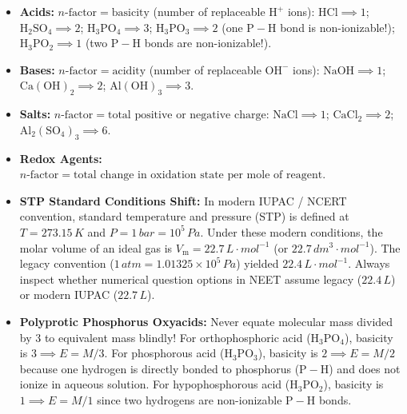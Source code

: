 \documentclass[10pt,a4paper]{article}
\begin{document}
\begin{ncertbox}
\begin{itemize}
  \item \textbf{Acids:} $n\text{-factor} = \text{basicity}$ (number of replaceable $\mathrm{H}^+$ ions): $\mathrm{HCl} \implies 1$; $\mathrm{H_2SO_4} \implies 2$; $\mathrm{H_3PO_4} \implies 3$; $\mathrm{H_3PO_3} \implies 2$ (one $\mathrm{P-H}$ bond is non-ionizable!); $\mathrm{H_3PO_2} \implies 1$ (two $\mathrm{P-H}$ bonds are non-ionizable!).
  \item \textbf{Bases:} $n\text{-factor} = \text{acidity}$ (number of replaceable $\mathrm{OH}^-$ ions): $\mathrm{NaOH} \implies 1$; $\mathrm{Ca(OH)_2} \implies 2$; $\mathrm{Al(OH)_3} \implies 3$.
  \item \textbf{Salts:} $n\text{-factor} = \text{total positive or negative charge}$: $\mathrm{NaCl} \implies 1$; $\mathrm{CaCl_2} \implies 2$; $\mathrm{Al_2(SO_4)_3} \implies 6$.
  \item \textbf{Redox Agents:} $n\text{-factor} = \text{total change in oxidation state per mole of reagent}$.
\end{itemize}
\end{ncertbox}

\begin{trapbox}
\begin{itemize}
  \item \textbf{STP Standard Conditions Shift:} In modern IUPAC / NCERT convention, standard temperature and pressure (STP) is defined at $T = 273.15\,\si{K}$ and $P = 1\,\si{bar} = 10^5\,\si{Pa}$. Under these modern conditions, the molar volume of an ideal gas is $V_{\mathrm{m}} = 22.7\,\si{L\cdot mol^{-1}}$ (or $22.7\,\si{dm^3\cdot mol^{-1}}$). The legacy convention ($1\,\si{atm} = 1.01325\times 10^5\,\si{Pa}$) yielded $22.4\,\si{L\cdot mol^{-1}}$. Always inspect whether numerical question options in NEET assume legacy ($22.4\,\si{L}$) or modern IUPAC ($22.7\,\si{L}$).
  \item \textbf{Polyprotic Phosphorus Oxyacids:} Never equate molecular mass divided by 3 to equivalent mass blindly! For orthophosphoric acid ($\mathrm{H_3PO_4}$), basicity is $3 \implies E = M/3$. For phosphorous acid ($\mathrm{H_3PO_3}$), basicity is $2 \implies E = M/2$ because one hydrogen is directly bonded to phosphorus ($\mathrm{P-H}$) and does not ionize in aqueous solution. For hypophosphorous acid ($\mathrm{H_3PO_2}$), basicity is $1 \implies E = M/1$ since two hydrogens are non-ionizable $\mathrm{P-H}$ bonds.
\end{itemize}
\end{trapbox}
\end{document}
